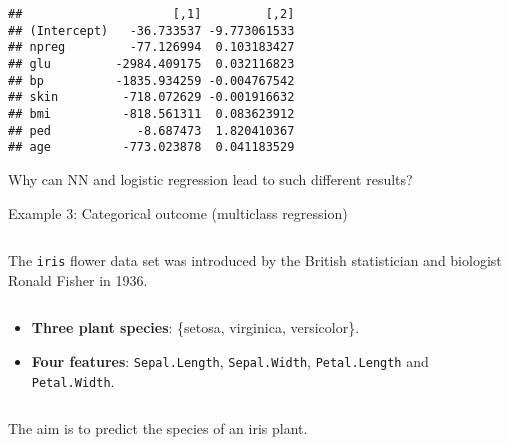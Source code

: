 \documentclass[10pt,ignorenonframetext,]{beamer}
\providecommand{\tightlist}{%
  \setlength{\itemsep}{0pt}\setlength{\parskip}{0pt}}
\begin{document}
\begin{frame}[fragile]
\begin{verbatim}
##                     [,1]         [,2]
## (Intercept)   -36.733537 -9.773061533
## npreg         -77.126994  0.103183427
## glu         -2984.409175  0.032116823
## bp          -1835.934259 -0.004767542
## skin         -718.072629 -0.001916632
## bmi          -818.561311  0.083623912
## ped            -8.687473  1.820410367
## age          -773.023878  0.041183529
\end{verbatim}

\end{frame}

\begin{frame}

Why can NN and logistic regression lead to such different results?

\end{frame}

\begin{frame}[fragile]

\begin{block}{Example 3: Categorical outcome (multiclass regression)}

\(~\)

The \texttt{iris} flower data set was introduced by the British
statistician and biologist Ronald Fisher in 1936.

\(~\)

\begin{itemize}
\tightlist
\item
  \textbf{Three plant species}: \{setosa, virginica, versicolor\}.
\item
  \textbf{Four features}: \texttt{Sepal.Length}, \texttt{Sepal.Width},
  \texttt{Petal.Length} and \texttt{Petal.Width}.
\end{itemize}

\(~\)

The aim is to predict the species of an iris plant.

\end{block}

\end{frame}
\end{document}
